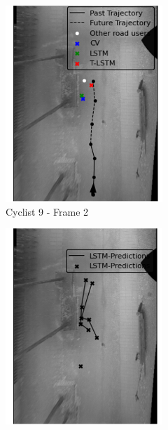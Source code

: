 \documentclass{article}
\begin{document}
\begin{figure}[H]
\begin{subfigure}{0.4\textwidth}
  \includegraphics[width=\linewidth]{quali_results/cyc-9-2.png}
  \caption{Cyclist 9 - Frame 2}
  \label{fig:cyc9-2}
\end{subfigure}
\begin{subfigure}{0.40\textwidth}
  \centering
  \includegraphics[width=\linewidth]{quali_results/cyc-9-l.png}

\end{subfigure}
\end{figure}
\end{document}
